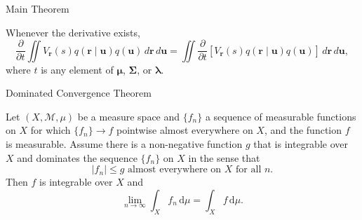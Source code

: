 \documentclass{beamer}
\newcommand{\dt}{\frac{\partial}{\partial t}}
\newcommand{\dx}{\,d\mathbf{r}\,d\mathbf{u}}
\begin{document}

\begin{frame}{Main Theorem}
  \begin{theorem}
    Whenever the derivative exists,
    \[
      \dt\iint
      V_{\mathbf{r}}(s)q(\mathbf{r} \mid \mathbf{u})q(\mathbf{u})\dx
      = \iint
      \dt[V_{\mathbf{r}}(s)q(\mathbf{r} \mid \mathbf{u})q(\mathbf{u})]\dx,
    \]
    where $t$ is any element of $\bm\mu$, $\bm\Sigma$, or $\bm\lambda$.
  \end{theorem}
\end{frame}

\begin{frame}{Dominated Convergence Theorem}
  \begin{theorem}
    Let $(X, \mathcal{M}, \mu)$ be a measure space and $\{ f_n \}$ a sequence of
    \alert{measurable} functions on $X$ for which $\{ f_n \} \to f$ pointwise
    almost everywhere on $X$, and the function $f$ is \alert{measurable}. Assume
    there is a \alert{non-negative function $g$} that is \alert{integrable} over
    $X$ and \alert{dominates} the sequence $\{ f_n \}$ on $X$ in the sense that
    \[
      |f_n| \le g \text{ almost everywhere on $X$ for all $n$.}
    \]
    Then $f$ is integrable over $X$ and
    \[
      \lim_{n \to \infty} \int_X f_n\,\mathrm{d}\mu = \int_X f\,\mathrm{d}\mu.
    \]
  \end{theorem}
\end{frame}
\end{document}
